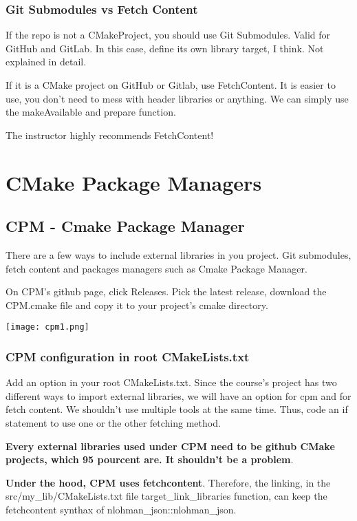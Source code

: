 \subsection{Git Submodules vs Fetch Content}

If the repo is not a CMakeProject, you should use Git Submodules. Valid for GitHub and GitLab. In this case, 
define its own library target, I think. Not explained in detail.

If it is a CMake project on GitHub or Gitlab, use FetchContent. It is easier to use, you don't need to mess with header
libraries or anything. We can simply use the makeAvailable and prepare function.

The instructor highly recommends FetchContent!


\chapter{CMake Package Managers}

\section{CPM - Cmake Package Manager}

There are a few ways to include external libraries in you project. Git submodules, fetch content and packages managers such as
Cmake Package Manager.

On CPM's github page, click Releases. Pick the latest release, download the CPM.cmake file and copy it to your project's
cmake directory.

\begin{center}
    \texttt{[image: cpm1.png]}
\end{center}


\subsection{CPM configuration in root CMakeLists.txt}

Add an option in your root CMakeLists.txt.
Since the course's project has two different ways to import external libraries,
we will have an option for cpm and for fetch content.
We shouldn't use multiple tools at the same time. Thus, code
an if statement to use one or the other fetching method.

\textbf{Every external libraries used under CPM need to be github CMake projects, which 95 pourcent are.
It shouldn't be a problem}.


\textbf{Under the hood, CPM uses fetchcontent}. Therefore, the linking,
in the src/my\_lib/CMakeLists.txt file target\_link\_libraries function, 
can keep the fetchcontent synthax of nlohman\_json::nlohman\_json.


